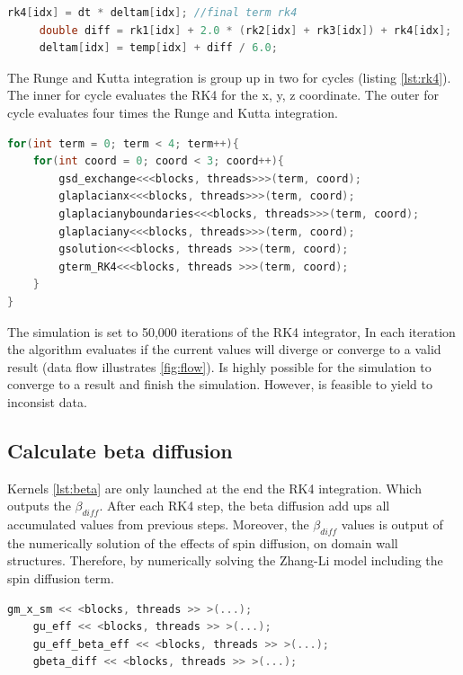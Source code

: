 \begin{lstlisting}[language=C++, label={lst:rk4cuda}, caption={4th term of the Runge and Kutta integration}] 
     rk4[idx] = dt * deltam[idx]; //final term rk4
     double diff = rk1[idx] + 2.0 * (rk2[idx] + rk3[idx]) + rk4[idx];
     deltam[idx] = temp[idx] + diff / 6.0;	
\end{lstlisting}


The Runge and Kutta integration is group up in two {\listf for} cycles (listing \ref{lst:rk4}). The inner {\listf for} cycle evaluates the RK4 for the x, y, z coordinate. The outer {\listf for} cycle evaluates four times the Runge and Kutta integration.

\begin{lstlisting}[language=C++, label={lst:rk4}, caption={Summarize of Runge and Kutta 4th Integration}]
for(int term = 0; term < 4; term++){
	for(int coord = 0; coord < 3; coord++){
    	gsd_exchange<<<blocks, threads>>>(term, coord);
    	glaplacianx<<<blocks, threads>>>(term, coord);
    	glaplacianyboundaries<<<blocks, threads>>>(term, coord);
    	glaplaciany<<<blocks, threads>>>(term, coord);
    	gsolution<<<blocks, threads >>>(term, coord);
    	gterm_RK4<<<blocks, threads >>>(term, coord);
    }
}
\end{lstlisting}

 The simulation is set to 50,000 iterations of the RK4 integrator, In each iteration the algorithm evaluates if the current values will diverge or converge to a valid result (data flow illustrates \ref{fig:flow}). Is highly possible for the simulation to converge to a result and finish the simulation. However, is feasible to yield to inconsist data.
 
\subsection{Calculate beta diffusion}

Kernels \ref{lst:beta} are only launched at the end the RK4 integration. Which outputs the $\beta_{diff}$. After each RK4 step, the beta diffusion add ups all accumulated values from previous steps. Moreover, the $\beta_{diff}$ values is output of the numerically solution of the effects of spin diffusion, on domain wall structures. Therefore, by numerically solving the Zhang-Li model including the spin diffusion term.

\begin{lstlisting}[language=C++, label={lst:beta}, caption={Calculate beta diffusion }]
    gm_x_sm << <blocks, threads >> >(...); 
    gu_eff << <blocks, threads >> >(...); 
    gu_eff_beta_eff << <blocks, threads >> >(...); 	
    gbeta_diff << <blocks, threads >> >(...);               
\end{lstlisting}

